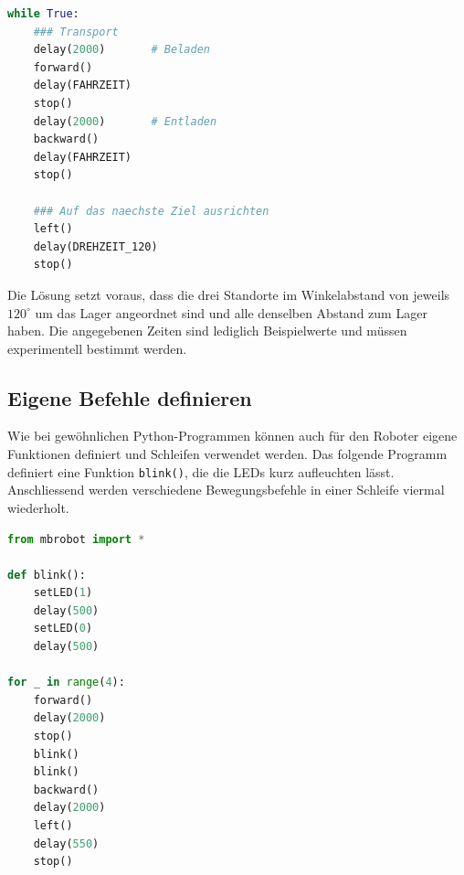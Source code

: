 \begin{myexercise}
\begin{myanswer}
\begin{lstlisting}[language=Python]
while True:
    ### Transport
    delay(2000)       # Beladen
    forward()
    delay(FAHRZEIT)
    stop()
    delay(2000)       # Entladen
    backward()
    delay(FAHRZEIT)
    stop()
    
    ### Auf das naechste Ziel ausrichten            
    left()
    delay(DREHZEIT_120)
    stop()
        \end{lstlisting}

        Die Lösung setzt voraus, dass die drei Standorte
        im Winkelabstand von jeweils \(120^\circ\) um
        das Lager angeordnet sind und alle denselben
        Abstand zum Lager haben. Die angegebenen Zeiten
        sind lediglich Beispielwerte und müssen
        experimentell bestimmt werden.
    \end{myanswer}
\end{myexercise}



\subsection*{Eigene Befehle definieren}




Wie bei gewöhnlichen Python-Programmen können auch für
den Roboter eigene Funktionen definiert und Schleifen
verwendet werden. Das folgende Programm definiert eine
Funktion \texttt{blink()}, die die LEDs kurz aufleuchten
lässt. Anschliessend werden verschiedene Bewegungsbefehle
in einer Schleife viermal wiederholt.

\begin{lstlisting}[language=Python]
from mbrobot import *

def blink():
    setLED(1)
    delay(500)
    setLED(0)
    delay(500)

for _ in range(4):
    forward()
    delay(2000)
    stop()
    blink()
    blink()
    backward()
    delay(2000)
    left()
    delay(550)
    stop()
\end{lstlisting}

